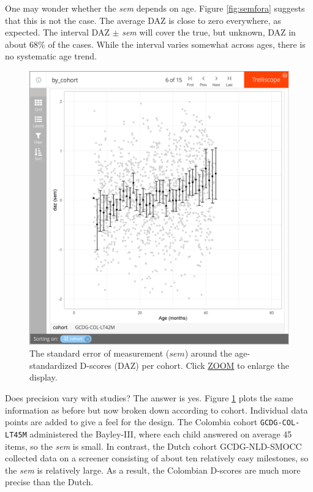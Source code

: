 \documentclass[
]{book}
\begin{document}
One may wonder whether the \emph{sem} depends on age. Figure \ref{fig:semfora} suggests that this is not the case. The average DAZ is close to zero everywhere, as expected. The interval DAZ \(\pm\) \emph{sem} will cover the true, but unknown, DAZ in about 68\% of the cases. While the interval varies somewhat across ages, there is no systematic age trend.

\begin{figure}

{\centering \includegraphics[width=1\linewidth]{fig/fig_6.4} 

}

\caption{The standard error of measurement (\(sem\)) around the age-standardized D-scores (DAZ) per cohort. Click \href{https://d-score.org/dbook-apps/gcdgsem/\#display=by_cohort\&nrow=1\&ncol=1\&arr=row\&pg=6\&labels=cohort\&sort=cohort;asc\&filter=\&sidebar=\&fv=}{ZOOM} to enlarge the display.}\label{fig:dscoresems}
\end{figure}



Does precision vary with studies? The answer is yes. Figure \ref{fig:dscoresems} plots the same information as before but now broken down according to cohort. Individual data points are added to give a feel for the design. The Colombia cohort \texttt{GCDG-COL-LT45M} administered the Bayley-III, where each child answered on average 45 items, so the \emph{sem} is small. In contrast, the Dutch cohort GCDG-NLD-SMOCC collected data on a screener consisting of about ten relatively easy milestones, so the \emph{sem} is relatively large. As a result, the Colombian D-scores are much more precise than the Dutch.
\end{document}
